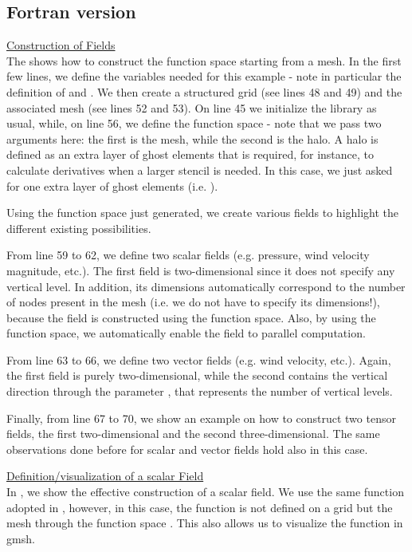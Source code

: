 \subsection{Fortran version}
%
\begin{description}
%
\item \underline{Construction of Fields}\\[0.5em]
%
The  shows how to construct the function space 
 starting from a mesh. In the first few lines, we define 
the variables needed for this example - note in particular the definition 
of  and .
We then create a structured grid (see lines 48 and 49) and the associated 
mesh (see lines 52 and 53).
On line 45 we initialize the library as usual, while, on line 56, 
we define the  function space - note that we pass two 
arguments here: the first is the mesh, while the second is the halo. 
A halo is defined as an extra layer of ghost elements that is required, 
for instance, to calculate derivatives when a larger stencil is needed. 
In this case, we just asked for one extra layer of ghost elements (i.e. 
). 

Using the function space  just generated, we create 
various fields to highlight the different existing possibilities.

From line 59 to 62, we define two scalar fields (e.g. pressure, 
wind velocity magnitude, etc.). The first field is two-dimensional 
since it does not specify any vertical level. In addition, its 
dimensions automatically correspond to the number of nodes present 
in the mesh (i.e. we do not have to specify its dimensions!), because 
the field is constructed using the function space. Also, by using the 
function space, we automatically enable the field to parallel computation.

From line 63 to 66,  we define two vector fields (e.g. wind 
velocity, etc.). Again, the first field is purely two-dimensional, 
while the second contains the vertical direction through the parameter 
, that represents the number of vertical levels. 

Finally, from line 67 to 70, we show an example on how to construct 
two tensor fields, the first two-dimensional and the second three-dimensional. 
The same observations done before for scalar and vector fields hold 
also in this case.
%

%
%
\item \underline{Definition/visualization of a scalar Field}\\[0.5em]
%
%
In , we show the effective construction 
of a scalar field. We use the same function adopted in , 
however, in this case, the function is not defined on a grid but 
the mesh through the function space . This also allows 
us to visualize the function in gmsh.


\end{description}
